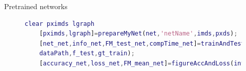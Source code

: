 \documentclass[aspectratio=169,xcolor=dvipsnames]{beamer}
\begin{document}
\begin{frame}[fragile]{Pretrained networks}
	
	\begin{figure}
		\centering\hspace{5 mm}
\begin{minipage}{0.2\linewidth}\centering
	\tiny{\def\svgwidth{\linewidth}
	}
\end{minipage}\hfill
\begin{minipage}{0.7\linewidth}
	\centering
	\tiny{\def\svgwidth{0.85\linewidth}
	}
\end{minipage}
	\begin{minipage}{0.9\linewidth}
	\tiny{\begin{lstlisting}[language=Matlab,basicstyle=\tiny]
	clear pximds lgraph
	[pximds,lgraph]=prepareMyNet(net,'netName',imds,pxds);
	[net_net,info_net,FM_test_net,compTime_net]=trainAndTest(pximds,lgraph,...
	dataPath,f_test,gt_train);	
	[accuracy_net,loss_net,FM_mean_net]=figureAccAndLoss(info_net,FM_test_net)
	\end{lstlisting}}
\end{minipage}
	\end{figure}
\end{frame}
\end{document}
